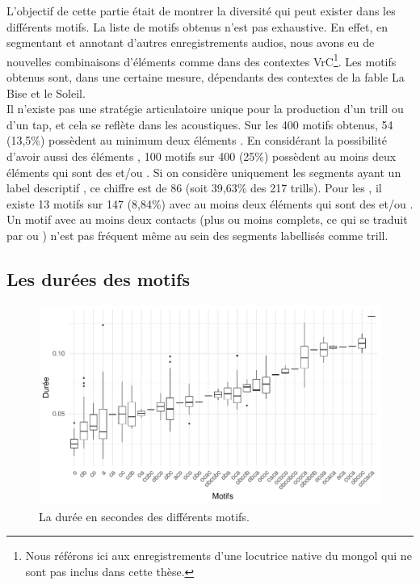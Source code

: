 L'objectif de cette partie était de montrer la diversité qui peut exister dans les différents motifs. La liste de motifs obtenus n'est pas exhaustive. En effet, en segmentant et annotant d'autres enregistrements audios, nous avons eu de nouvelles combinaisons d'éléments comme  dans des contextes VrC\footnote{Nous référons ici aux enregistrements d'une locutrice native du mongol qui ne sont pas inclus dans cette thèse.}. Les motifs obtenus sont, dans une certaine mesure, dépendants des contextes de la fable La Bise et le Soleil.\\

Il n'existe pas une stratégie articulatoire unique pour la production d'un trill ou d'un tap, et cela se reflète dans les acoustiques.
Sur les 400 motifs obtenus, 54 (13,5\%) possèdent au minimum deux éléments . En considérant la possibilité d'avoir aussi des éléments , 100 motifs sur 400 (25\%) possèdent au moins deux éléments qui sont des  et/ou . 
Si on considère uniquement les segments ayant un label descriptif , ce chiffre est de 86 (soit  39,63\% des 217 trills). Pour les , il existe 13 motifs sur 147 (8,84\%) avec au moins deux éléments qui sont des  et/ou .\\

Un motif avec au moins deux contacts (plus ou moins complets, ce qui se traduit par  ou ) n'est pas fréquent même au sein des segments labellisés comme trill.

\subsection{Les durées des motifs}

\begin{figure}
	\centering
	\includegraphics[width=1\linewidth]{substance/images/motifs_duree}
		\caption[La durée en secondes des différents motifs]{La durée en secondes des différents motifs.}
	\label{fig:motifsduree}
\end{figure}

